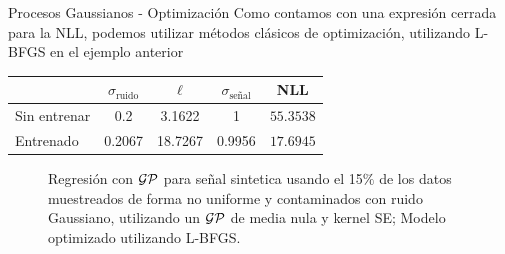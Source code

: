 \documentclass[9pt]{beamer}
\begin{document}
\begin{frame}{Procesos Gaussianos - Optimización}
Como contamos con una expresión cerrada para la NLL, podemos utilizar métodos clásicos de optimización, utilizando L-BFGS en el ejemplo anterior \pause 

    \begin{table}[H]
        \centering
        \begin{tabular}{lcccc}
         & $\sigma_{\text{ruido}}$ & $\ell$ & $\sigma_{\text{señal}}$ & NLL\\ \hline
        Sin entrenar & 0.2 & 3.1622 & 1 & $\mathbf{55.3538}$\\
        Entrenado & 0.2067 & 18.7267 & 0.9956 & $\mathbf{17.6945}$\\
        \end{tabular}
    \end{table} \pause 
        
        
    \begin{figure}[H]
            \centering
            \caption{Regresión con $\mathcal{GP}$ para señal sintetica usando el 15$\%$ de los datos muestreados de forma no uniforme y contaminados con ruido Gaussiano, utilizando un $\mathcal{GP}$ de media nula y kernel SE; Modelo optimizado utilizando L-BFGS.}
    \end{figure}
\end{frame}
\end{document}
